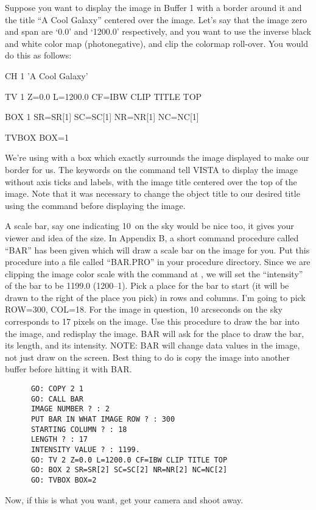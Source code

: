 Suppose you want to display the image in Buffer 1 with a border around it and
the title ``A Cool Galaxy'' centered over the image. Let's say that the image
zero and span are `0.0' and `1200.0' respectively, and you want to use the
inverse black and white color map (photonegative), and clip the colormap
roll-over.  You would do this as follows:
\begin{command}
      \item CH 1 'A Cool Galaxy'
      \item TV 1 Z=0.0 L=1200.0 CF=IBW CLIP TITLE TOP
      \item BOX 1 SR=SR[1] SC=SC[1] NR=NR[1] NC=NC[1]
      \item TVBOX BOX=1
\end{command}
We're using  with a box which exactly surrounds the image
displayed to make our border for us.  The keywords  on the
 command tell VISTA to display the image without axis ticks and
labels, with the image title centered over the top of the image.  Note that it
was necessary to change the object title to our desired title using the
 command before displaying the image.

A scale bar, say one indicating 10\arcsec\ on the sky would be nice too, it
gives your viewer and idea of the size.  In Appendix B, a short command
procedure called ``BAR'' has been given which will draw a scale bar on the
image for you.  Put this procedure into a file called ``BAR.PRO'' in your
procedure directory.  Since we are clipping the image color scale with the
 command at , we will set the ``intensity'' of the bar
to be 1199.0 (1200--1).  Pick a place for the bar to start (it will be drawn
to the right of the place you pick) in rows and columns. I'm going to pick
ROW=300, COL=18.  For the image in question, 10 arcseconds on the sky
corresponds to 17 pixels on the image.  Use this procedure to draw the bar
into the image, and redisplay the image.  BAR will ask for the place to draw
the bar, its length, and its intensity.  NOTE:  BAR will change data values in
the image, not just draw on the screen.  Best thing to do is copy the image
into another buffer before hitting it with BAR.

\begin{verbatim}
      GO: COPY 2 1
      GO: CALL BAR
      IMAGE NUMBER ? : 2
      PUT BAR IN WHAT IMAGE ROW ? : 300
      STARTING COLUMN ? : 18
      LENGTH ? : 17
      INTENSITY VALUE ? : 1199.
      GO: TV 2 Z=0.0 L=1200.0 CF=IBW CLIP TITLE TOP
      GO: BOX 2 SR=SR[2] SC=SC[2] NR=NR[2] NC=NC[2]
      GO: TVBOX BOX=2
\end{verbatim}

Now, if this is what you want, get your camera and shoot away.



%
